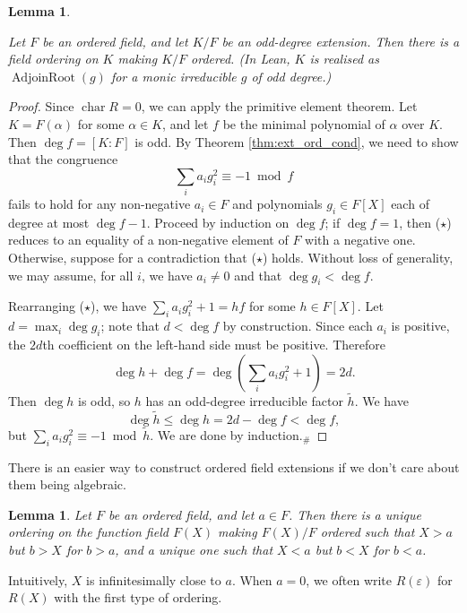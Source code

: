 \documentclass{article}
\newtheorem{lemma}[theorem]{Lemma}
\newcommand{\ch}{\operatorname{char}}
\newcommand{\eps}{\varepsilon}
\newcommand{\leanok}{}
\newcommand{\lean}[1]{}
\newcommand{\uses}[1]{}
\begin{document}
\begin{lemma}
  \label{lem:ext_ord_odd_deg}
  \lean{IsRealClosed.exists_ordered_algebra_adjoinRoot_odd_irreducible}
  \leanok
  Let $F$ be an ordered field, and let $K/F$ be an odd-degree extension. Then there is a field ordering on $K$ making $K/F$ ordered. (In Lean, $K$ is realised as $\operatorname{AdjoinRoot}(g)$ for a monic irreducible $g$ of odd degree.)
\end{lemma}
\begin{proof}
  \uses{thm:ext_ord_cond}
  \leanok
  Since $\ch R=0$, we can apply the primitive element theorem. Let $K=F(\alpha)$ for some $\alpha\in K$, and let $f$ be the minimal polynomial of $\alpha$ over $K$. Then $\deg f=[K:F]$ is odd. By Theorem \ref{thm:ext_ord_cond}, we need to show that the congruence
  \[\sum_ia_ig_i^2\equiv-1\bmod f\tag{$\star$}\]
  fails to hold for any non-negative $a_i\in F$ and polynomials $g_i\in F[X]$ each of degree at most $\deg f-1$. Proceed by induction on $\deg f$; if $\deg f=1$, then ($\star$) reduces to an equality of a non-negative element of $F$ with a negative one. Otherwise, suppose for a contradiction that ($\star$) holds. Without loss of generality, we may assume, for all $i$, we have $a_i\neq0$ and that $\deg g_i<\deg f$.

  Rearranging ($\star$), we have $\sum_ia_ig_i^2+1=hf$ for some $h\in F[X]$. Let $d=\max_i\deg g_i$; note that $d<\deg f$ by construction. Since each $a_i$ is positive, the $2d$th coefficient on the left-hand side must be positive. Therefore
  \[\deg h+\deg f=\deg\left(\sum_ia_ig_i^2+1\right)=2d.\]
  Then $\deg h$ is odd, so $h$ has an odd-degree irreducible factor $\tilde h$. We have
  \[\deg\tilde h\leq\deg h=2d-\deg f<\deg f,\]
  but $\sum_ia_ig_i^2\equiv-1\bmod\tilde h$. We are done by induction.$_\#$
\end{proof}

There is an easier way to construct ordered field extensions if we don't care about them being algebraic.

\begin{lemma}
  \label{lem:order_fun_field}
  Let $F$ be an ordered field, and let $a\in F$. Then there is a unique ordering on the function field $F(X)$ making $F(X)/F$ ordered such that $X>a$ but $b>X$ for $b>a$, and a unique one such that $X<a$ but $b<X$ for $b<a$.
\end{lemma}

Intuitively, $X$ is infinitesimally close to $a$. When $a=0$, we often write $R(\eps)$ for $R(X)$ with the first type of ordering.
\end{document}
